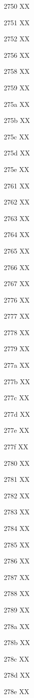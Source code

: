 \documentclass[11pt]{article}
\begin{document}
2750 X{}X

2751 X{}X

2752 X{}X

2756 X{}X

2758 X{}X

2759 X{}X

275a X{}X

275b X{}X

275c X{}X

275d X{}X

275e X{}X

2761 X{}X

2762 X{}X

2763 X{}X

2764 X{}X

2765 X{}X

2766 X{}X

2767 X{}X

2776 X{}X

2777 X{}X

2778 X{}X

2779 X{}X

277a X{}X

277b X{}X

277c X{}X

277d X{}X

277e X{}X

277f X{}X

2780 X{}X

2781 X{}X

2782 X{}X

2783 X{}X

2784 X{}X

2785 X{}X

2786 X{}X

2787 X{}X

2788 X{}X

2789 X{}X

278a X{}X

278b X{}X

278c X{}X

278d X{}X

278e X{}X
\end{document}
